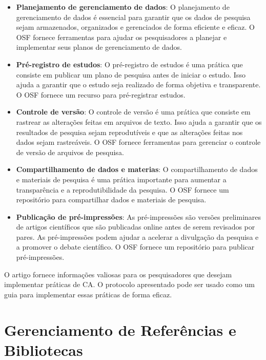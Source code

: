 \documentclass[
  a4paper,
]{article}
\begin{document}
\begin{tcolorbox}
\begin{itemize}
\item
  \textbf{Planejamento de gerenciamento de dados}: O planejamento de
  gerenciamento de dados é essencial para garantir que os dados de
  pesquisa sejam armazenados, organizados e gerenciados de forma
  eficiente e eficaz. O OSF fornece ferramentas para ajudar os
  pesquisadores a planejar e implementar seus planos de gerenciamento de
  dados.
\item
  \textbf{Pré-registro de estudos}: O pré-registro de estudos é uma
  prática que consiste em publicar um plano de pesquisa antes de iniciar
  o estudo. Isso ajuda a garantir que o estudo seja realizado de forma
  objetiva e transparente. O OSF fornece um recurso para pré-registrar
  estudos.
\item
  \textbf{Controle de versão}: O controle de versão é uma prática que
  consiste em rastrear as alterações feitas em arquivos de texto. Isso
  ajuda a garantir que os resultados de pesquisa sejam reprodutíveis e
  que as alterações feitas nos dados sejam rastreáveis. O OSF fornece
  ferramentas para gerenciar o controle de versão de arquivos de
  pesquisa.
\item
  \textbf{Compartilhamento de dados e materias}: O compartilhamento de
  dados e materiais de pesquisa é uma prática importante para aumentar a
  transparência e a reprodutibilidade da pesquisa. O OSF fornece um
  repositório para compartilhar dados e materiais de pesquisa.
\item
  \textbf{Publicação de pré-impressões}: As pré-impressões são versões
  preliminares de artigos científicos que são publicadas online antes de
  serem revisados por pares. As pré-impressões podem ajudar a acelerar a
  divulgação da pesquisa e a promover o debate científico. O OSF fornece
  um repositório para publicar pré-impressões.
\end{itemize}

O artigo fornece informações valiosas para os pesquisadores que desejam
implementar práticas de CA. O protocolo apresentado pode ser usado como
um guia para implementar essas práticas de forma eficaz.

\end{tcolorbox}


\section{Gerenciamento de Referências e Bibliotecas}\label{sec-zotero}
\end{document}
